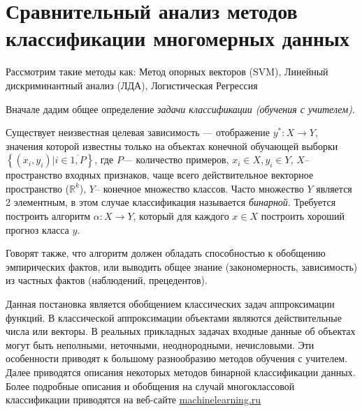 \section{Сравнительный анализ методов классификации многомерных данных }
\begin{annotation}
	Рассмотрим такие методы как: Метод опорных векторов (SVM), Линейный дискриминантный анализ (ЛДА), Логистическая Регрессия
\end{annotation}

Вначале дадим общее определение \textit{задачи классификации (обучения с учителем)}.

Существует неизвестная целевая зависимость — отображение $y^{*}: X\to Y$, значения которой известны только на объектах конечной обучающей выборки $\left\{(x_i,y_i)| i \in \overline{1,P}\right\}$, где $P$--- количество примеров, $x_i \in  X, y_i \in Y$, $X$-- пространство входных признаков, чаще всего действительное векторное пространство ($\mathbb R^k$), $Y$-- конечное множество классов. Часто множество $Y$ является 2 элементным, в этом случае классификация называется \textit{бинарной}. Требуется построить  алгоритм $\alpha: X\to Y$, который для каждого $x \in X$  построить хороший прогноз класса $y$.

Говорят также, что алгоритм должен обладать способностью к обобщению эмпирических фактов, или выводить общее знание (закономерность, зависимость) из частных фактов (наблюдений, прецедентов).

Данная постановка является обобщением классических задач аппроксимации функций. В классической аппроксимации объектами являются действительные числа или векторы. В реальных прикладных задачах входные данные об объектах могут быть неполными, неточными, неоднородными, нечисловыми. Эти особенности приводят к большому разнообразию методов обучения с учителем. Далее приводятся описания некоторых методов бинарной классификации данных. Более подробные описания и обобщения на случай многоклассовой классификации приводятся на веб-сайте \url{machinelearning.ru} \cite{mlru}

